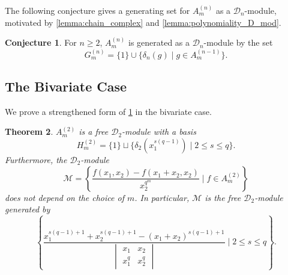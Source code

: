 \documentclass[12pt,a4paper]{report}
\newtheorem{theorem}{Theorem}[chapter]
\theoremstyle{definition}
\newtheorem{conjecture}[theorem]{Conjecture}
\theoremstyle{remark}
\theoremstyle{definition}
\begin{document}
The following conjecture gives a generating set for $A_{m}^{(n)}$ as a $\mathcal{D}_n$-module, motivated by \cref{lemma:chain_complex} and \cref{lemma:polynomiality_D_mod}.
\begin{conjecture}\label{conj:polynomiality}
   For $n\geq 2$, $A_{m}^{(n)}$ is generated as a $\mathcal{D}_n$-module by the set
    \begin{equation*}
        G_{m}^{(n)} = \{1\}\cup \{\delta_{n}(g)\mid g\in A_{m}^{(n-1)}\}.
    \end{equation*}
\end{conjecture}
\subsection{The Bivariate Case}\label{subsection:poly_bivariate}
We prove a strengthened form of \cref{conj:polynomiality} in the bivariate case.
\begin{theorem}\label{thm:pol_bivariate}
    $A_{m}^{(2)}$ is a free $\mathcal{D}_2$-module with a basis
    \begin{equation*}
        H_{m}^{(2)} = \{1\}\sqcup \{\delta_2(x_1^{s(q-1)})\mid 2\leq s\leq q\}.
    \end{equation*}
    Furthermore, the $\mathcal{D}_2$-module
\begin{equation*}
    \mathcal{M} = \left\{\dfrac{f(x_1, x_2) - f(x_1 + x_2, x_2)}{x_2^{q^m}}\mid f\in A_{m}^{(2)}\right\}
\end{equation*} 
does not depend on the choice of $m$. In particular, $\mathcal{M}$ is the free $\mathcal{D}_2$-module generated by 
\begin{equation*}
    \left\{\dfrac{x_1^{s(q-1)+1} + x_2^{s(q-1)+1} - (x_1 + x_2)^{s(q-1)+1}}{\begin{vmatrix}
        x_1 & x_2\\
        x_1^{q}& x_2^{q}
    \end{vmatrix}}\mid 2\leq s\leq q\right\}.
\end{equation*}
\end{theorem}
\end{document}
